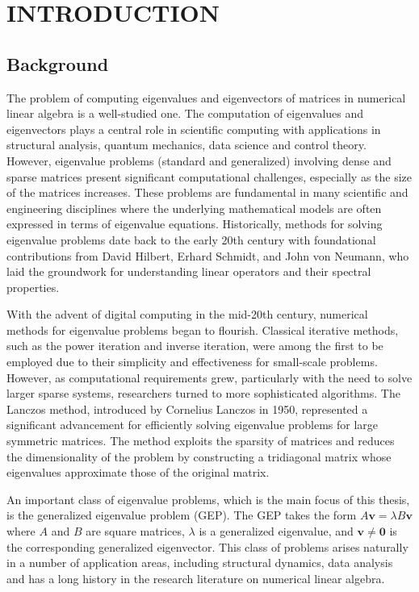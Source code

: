 \chapter{INTRODUCTION}

\section{Background}\label{sec:Background}

The problem of computing eigenvalues and eigenvectors of matrices in numerical linear algebra is a well-studied one. The computation of eigenvalues and eigenvectors plays a central role in scientific computing with applications in structural analysis, quantum mechanics, data science and control theory. However, eigenvalue problems (standard and generalized) involving dense and sparse matrices present significant computational challenges, especially as the size of the matrices increases. These problems are fundamental in many scientific and engineering disciplines where the underlying mathematical models are often expressed in terms of eigenvalue equations. Historically, methods for solving eigenvalue problems date back to the early 20th century with foundational contributions from David Hilbert, Erhard Schmidt, and John von Neumann, who laid the groundwork for understanding linear operators and their spectral properties.

With the advent of digital computing in the mid-20th century, numerical methods for eigenvalue problems began to flourish. Classical iterative methods, such as the power iteration and inverse iteration, were among the first to be employed due to their simplicity and effectiveness for small-scale problems. However, as computational requirements grew, particularly with the need to solve larger sparse systems, researchers turned to more sophisticated algorithms. The Lanczos method, introduced by Cornelius Lanczos in 1950,
represented a significant advancement for efficiently solving eigenvalue problems for large symmetric matrices. The method exploits the sparsity of matrices and reduces the dimensionality of the problem by constructing a tridiagonal matrix whose eigenvalues approximate those of the original matrix.

An important class of eigenvalue problems, which is the main focus of this thesis, is the generalized eigenvalue problem {} (GEP). The GEP takes the form $A\mathbf{v} = \lambda B\mathbf{v}$ where $A$ and $B$ are square matrices, $\lambda$ is a generalized eigenvalue, and $\mathbf{v}\neq\mathbf{0}$ is the corresponding generalized eigenvector. This class of problems arises naturally in a number of application areas, including structural dynamics, data analysis and has a long history in the research literature on numerical linear algebra.


